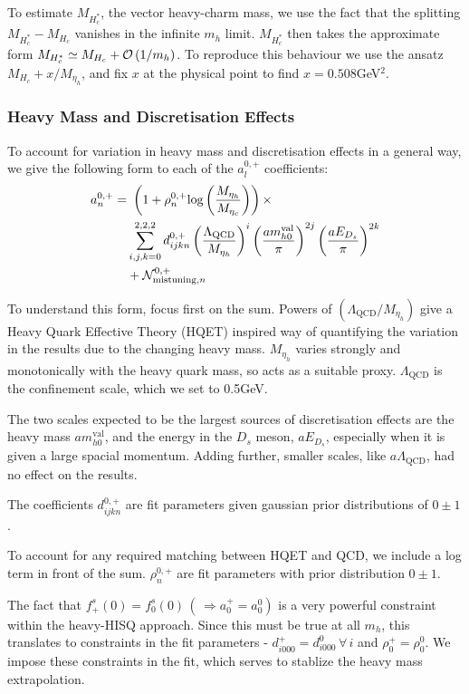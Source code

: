 To estimate $M_{H^*_c}$, the vector heavy-charm mass, we use the fact that the splitting $ M_{H_c^*} - M_{H_c}$ vanishes in the infinite $m_h$ limit. $M_{H_c^*}$ then takes the approximate form $M_{H_c^*} \simeq M_{H_c} + \mathcal{O}\left( 1/m_h \right)$. To reproduce this behaviour we use the ansatz $M_{H_c} + x/M_{\eta_h}$, and fix $x$ at the physical point to find $x=0.508$GeV$^2$.

\subsubsection{Heavy Mass and Discretisation Effects}

To account for variation in heavy mass and discretisation effects in a general way, we give the following form to each of the $a_l^{0,+}$ coefficients:
\begin{align}
  \nonumber  a_n^{0,+} = & \,\,\left( 1 + \rho^{0,+}_n \text{log}\left(M_{\eta_h}\over M_{\eta_c}\right)\right) \times \\ \nonumber
  &\sum_{i,j,k = 0}^{2,2,2} d^{0,+}_{ijkn} \left({\Lambda_{\text{QCD}}\over M_{\eta_h} }\right)^{i} \left({ am^{\text{val}}_{h0} \over \pi }\right)^{2j} \left({ aE_{D_s} \over \pi }\right)^{2k} \\ &+ \mathcal{N}_{\text{mistuning},n}^{0,+}
      \label{eq:mhfitfun}
\end{align}

To understand this form, focus first on the sum. Powers of $(\Lambda_{\text{QCD}}/M_{\eta_h})$ give a Heavy Quark Effective Theory (HQET) inspired way of quantifying the variation in the results due to the changing heavy mass. $M_{\eta_h}$ varies strongly and monotonically with the heavy quark mass, so acts as a suitable proxy. $\Lambda_{\text{QCD}}$ is the confinement scale, which we set to 0.5GeV.

The two scales expected to be the largest sources of discretisation effects are the heavy mass $am_{h0}^{\text{val}}$, and the energy in the $D_s$ meson, $aE_{D_s}$, especially when it is given a large spacial momentum. Adding further, smaller scales, like $a\Lambda_{\text{QCD}}$, had no effect on the results.

The coefficients $d^{0,+}_{ijkn}$ are fit parameters given gaussian prior distributions of $0\pm 1$.

To account for any required matching between HQET and QCD, we include a log term in front of the sum. $\rho^{0,+}_n$ are fit parameters with prior distribution $0\pm 1$.

The fact that $f^s_+(0) = f^s_0(0) \,(\,\Rightarrow a^+_0 = a^0_0)$ is a very powerful constraint within the heavy-HISQ approach. Since this must be true at all $m_h$, this translates to constraints in the fit parameters - $d^+_{i000}=d^0_{i000} \,\forall \,i$ and $\rho^+_0 = \rho^0_0$. We impose these constraints in the fit, which serves to stablize the heavy mass extrapolation.

